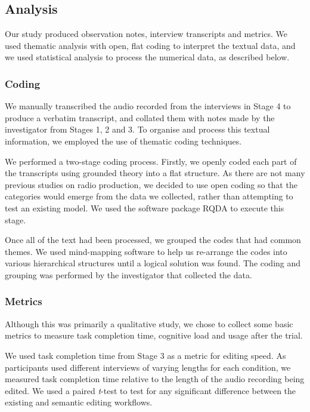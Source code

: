 \subsection{Analysis}
Our study produced observation notes, interview transcripts and metrics. We used thematic analysis with open, flat
coding to interpret the textual data, and we used statistical analysis to process the numerical data, as described below.

\subsubsection{Coding}
We manually transcribed the audio recorded from the interviews in Stage 4 to produce a verbatim transcript, and
collated them with notes made by the investigator from Stages 1, 2 and 3. To organise and process this textual
information, we employed the use of thematic coding techniques.

We performed a two-stage coding process.  Firstly, we openly coded each part of the transcripts using grounded theory
\citep{Silverman2016} into a flat structure.  As there are not many previous studies on radio production, we decided to
use open coding so that the categories would emerge from the data we collected, rather than attempting to test an
existing model.  We used the software package RQDA \citep{RQDA} to execute this stage.

Once all of the text had been processed, we grouped the codes that had common themes. We used mind-mapping software to
help us re-arrange the codes into various hierarchical structures until a logical solution was found.  The coding
and grouping was performed by the investigator that collected the data.

\subsubsection{Metrics}
Although this was primarily a qualitative study, we chose to collect some basic metrics to measure task completion
time, cognitive load and usage after the trial.

We used task completion time from Stage 3 as a metric for editing speed. As participants used different interviews of
varying lengths for each condition, we measured task completion time relative to the length of the audio
recording being edited. We used a paired \textit{t}-test \citep[p.~17]{Shalabh2009} to test for any significant
difference between the existing and semantic editing workflows.

